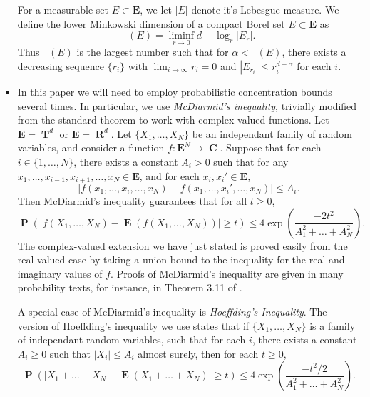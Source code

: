 \documentclass[12pt,reqno]{article}
\numberwithin{equation}{section}
\DeclareMathOperator{\hausdim}{\dim_{\mathbf{H}}}
\DeclareMathOperator{\lowminkdim}{\underline{\dim}_{\mathbf{M}}}
\DeclareMathOperator{\RR}{\mathbf{R}}
\DeclareMathOperator{\TT}{\mathbf{T}}
\DeclareMathOperator{\CC}{\mathbf{C}}
\numberwithin{theorem}{section}
\DeclareMathOperator{\EE}{\mathbf{E}}
\DeclareMathOperator{\PP}{\mathbf{P}}
\begin{document}
\begin{itemize}

    For a measurable set $E \subset \mathbf{E}$, we let $|E|$ denote it's Lebesgue measure. We define the lower Minkowski dimension of a compact Borel set $E \subset \mathbf{E}$ as
    \[ \lowminkdim(E) = \liminf_{r \to 0} d - \log_r|E_r|. \]
    Thus $\lowminkdim(E)$ is the largest number such that for $\alpha < \lowminkdim(E)$, there exists a decreasing sequence $\{ r_i \}$ with $\lim_{i \to \infty} r_i = 0$ and $|E_{r_i}| \leq r_i^{d - \alpha}$ for each $i$.

    \item In this paper we will need to employ probabilistic concentration bounds several times. In particular, we use \emph{McDiarmid's inequality}, trivially modified from the standard theorem to work with complex-valued functions. Let $\mathbf{E} = \TT^d$ or $\mathbf{E} = \RR^d$. Let $\{ X_1, \dots, X_N \}$ be an independant family of random variables, and consider a function $f: \mathbf{E}^N \to \CC$. Suppose that for each $i \in \{ 1, \dots, N \}$, there exists a constant $A_i > 0$ such that for any $x_1, \dots, x_{i-1}, x_{i+1}, \dots, x_N \in \mathbf{E}$, and for each $x_i, x_i' \in \mathbf{E}$,
    \[ |f(x_1, \dots, x_i, \dots, x_N) - f(x_1, \dots, x_i', \dots, x_N)| \leq A_i. \]
    Then McDiarmid's inequality guarantees that for all $t \geq 0$,
    \[ \PP \left( |f(X_1, \dots, X_N) - \EE(f(X_1, \dots, X_N))| \geq t \right) \leq 4 \exp \left( \frac{-2t^2}{A_1^2 + \dots + A_N^2} \right). \]
    The complex-valued extension we have just stated is proved easily from the real-valued case by taking a union bound to the inequality for the real and imaginary values of $f$. Proofs of McDiarmid's inequality are given in many probability texts, for instance, in Theorem 3.11 of \cite{VanHandel}.

    A special case of McDiarmid's inequality is \emph{Hoeffding's Inequality}. The version of Hoeffding's inequality we use states that if $\{ X_1, \dots, X_N \}$ is a family of independant random variables, such that for each $i$, there exists a constant $A_i \geq 0$ such that $|X_i| \leq A_i$ almost surely, then for each $t \geq 0$,
    \[ \PP \left( |X_1 + \dots + X_N - \EE(X_1 + \dots + X_N)| \geq t \right) \leq 4 \exp \left(\frac{-t^2/2}{A_1^2 + \dots + A_N^2} \right). \]


\end{itemize}
\end{document}
